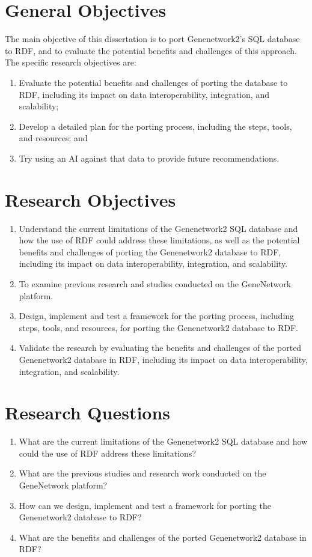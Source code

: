 \section{General Objectives}

The main objective of this dissertation is to port Genenetwork2's SQL database to RDF, and to evaluate the potential benefits and challenges of this approach.  The specific research objectives are:

\begin{enumerate}
\item Evaluate the potential benefits and challenges of porting the database to RDF, including its impact on data interoperability, integration, and scalability;
\item Develop a detailed plan for the porting process, including the steps, tools, and resources; and
\item Try using an AI against that data to provide future recommendations.
\end{enumerate}


\section{Research Objectives}

\begin{enumerate}
\item Understand the current limitations of the Genenetwork2 SQL database and how the use of RDF could address these limitations, as well as the potential benefits and challenges of porting the Genenetwork2 database to RDF, including its impact on data interoperability, integration, and scalability.
\item To examine previous research and studies conducted on the GeneNetwork platform.
\item Design, implement and test a framework for the porting process, including steps, tools, and resources, for porting the Genenetwork2 database to RDF.
\item Validate the research by evaluating the benefits and challenges of the ported Genenetwork2 database in RDF, including its impact on data interoperability, integration, and scalability.
\end{enumerate}

\section{Research Questions}

\begin{enumerate}
\item What are the current limitations of the Genenetwork2 SQL database and how could the use of RDF address these limitations?
\item What are the previous studies and research work conducted on the GeneNetwork platform?
\item How can we design, implement and test a framework for porting the Genenetwork2 database to RDF?
\item What are the benefits and challenges of the ported Genenetwork2 database in RDF?
\end{enumerate}



